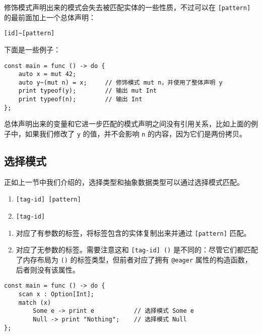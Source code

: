 修饰模式声明出来的模式会失去被匹配实体的一些性质，不过可以在 \lstinline![pattern]! 的最前面加上一个总体声明：

\begin{grammar} \label{grm:total-declaration}
    \lstinline![id]~[pattern]!
\end{grammar}

下面是一些例子：

\begin{lstlisting}
const main = func () -> do {
    auto x = mut 42;
    auto y~(mut n) = x;     // 修饰模式 mut n，并使用了整体声明 y
    print typeof(y);        // 输出 mut Int
    print typeof(n);        // 输出 Int
};
\end{lstlisting}

总体声明出来的变量和它进一步匹配的模式声明之间没有引用关系，比如上面的例子中，如果我们修改了 \lstinline!y! 的值，并不会影响 \lstinline!n! 的内容，因为它们是两份拷贝。

\subsection{选择模式}

正如上一节中我们介绍的，选择类型和抽象数据类型可以通过选择模式匹配。

\begin{grammar} \label{grm:choice-pattern}
\begin{enumerate}
    \item \lstinline![tag-id] [pattern]!
    \item \lstinline![tag-id]!
\end{enumerate}
\end{grammar}

\begin{enumerate}
    \item 对应了有参数的标签，将标签包含的实体复制出来并通过 \lstinline![pattern]! 匹配。
    \item 对应了无参数的标签。需要注意这和 \lstinline![tag-id] ()! 是不同的：尽管它们都匹配了内存布局为 \lstinline!()! 的标签类型，但前者对应了拥有 \lstinline!@eager! 属性的构造函数，后者则没有该属性。
\end{enumerate}

\begin{lstlisting}
const main = func () -> do {
    scan x : Option[Int];
    match (x)
        Some e -> print e           // 选择模式 Some e
        Null -> print "Nothing";    // 选择模式 Null
};
\end{lstlisting}

